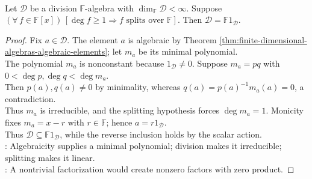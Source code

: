 \begin{theorem} \label{thm:division-algebra-algebraically-closed-field} \\
Let $\mathcal{D}$ be a division $\mathbb{F}$-algebra with $\dim_{\mathbb{F}}\mathcal{D}<\infty$. Suppose $(\forall\,f\in\mathbb{F}[x])\,[\deg f\geq1\Rightarrow f\text{ splits over }\mathbb{F}]$. Then $\mathcal{D}=\mathbb{F}1_{\mathcal{D}}$.
\begin{proof}
Fix $a\in\mathcal{D}$. The element $a$ is algebraic by Theorem \ref{thm:finite-dimensional-algebras-algebraic-elements}; let $m_a$ be its minimal polynomial.\\
The polynomial $m_a$ is nonconstant because $1_{\mathcal{D}}\neq0$. Suppose $m_a=pq$ with $0<\deg p,\deg q<\deg m_a$.\\
Then $p(a),q(a)\neq0$ by minimality, whereas $q(a)=p(a)^{-1}m_a(a)=0$, a contradiction.\\
Thus $m_a$ is irreducible, and the splitting hypothesis forces $\deg m_a=1$. Monicity fixes $m_a=x-r$ with $r\in\mathbb{F}$; hence $a=r1_{\mathcal{D}}$.\\
Thus $\mathcal{D}\subseteq\mathbb{F}1_{\mathcal{D}}$, while the reverse inclusion holds by the scalar action.\\
: Algebraicity supplies a minimal polynomial; division makes it irreducible; splitting makes it linear.\\
: A nontrivial factorization would create nonzero factors with zero product.
\end{proof}
\end{theorem}

